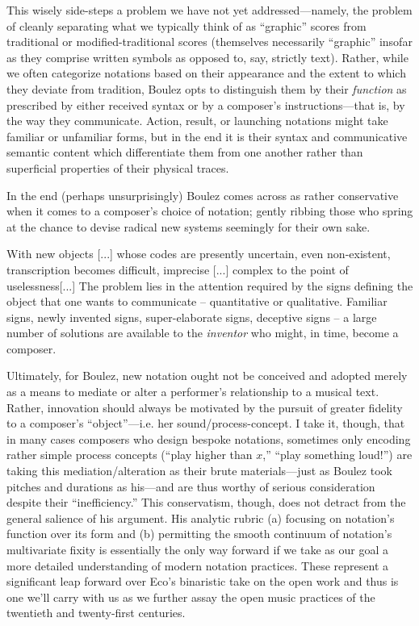     This wisely side-steps a problem we have not yet addressed---namely, the problem of cleanly separating what we typically think of as ``graphic'' scores from traditional or modified-traditional scores (themselves necessarily ``graphic''  insofar as they comprise written symbols as opposed to, say, strictly text). Rather, while we often categorize notations based on their appearance and the extent to which they deviate from tradition, Boulez opts to distinguish them by their \textit{function} as prescribed by either received syntax or by a composer's instructions---that is, by the way they communicate. Action, result, or launching notations might take familiar or unfamiliar forms, but in the end it is their syntax and communicative semantic content which differentiate them from one another rather than superficial properties of their physical traces.

    In the end (perhaps unsurprisingly) Boulez comes across as rather conservative when it comes to a composer's choice of notation; gently ribbing those who spring at the chance to devise radical new systems seemingly for their own sake.

    \begin{smallquote}
        With new objects [...] whose codes are presently uncertain, even non-existent, transcription becomes difficult, imprecise [...] complex to the point of uselessness[...] The problem lies in the attention required by the signs defining the object that one wants to communicate -- quantitative or qualitative. Familiar signs, newly invented signs, super-elaborate signs, deceptive signs -- a large number of solutions are available to the \textit{inventor} who might, in time, become a composer.\autocite[532]{Boulez_Nattiez_2019}
    \end{smallquote}

    \noindent Ultimately, for Boulez, new notation ought not be conceived and adopted merely as a means to mediate or alter a performer's relationship to a musical text. Rather, innovation should always be motivated by the pursuit of greater fidelity to a composer's ``object''---i.e. her sound/process-concept. I take it, though, that in many cases composers who design bespoke notations, sometimes only encoding rather simple process concepts (``play higher than $x$,'' ``play something loud!'') are taking this mediation/alteration as their brute materials---just as Boulez took pitches and durations as his---and are thus worthy of serious consideration despite their ``inefficiency.'' This conservatism, though, does not detract from the general salience of his argument. His analytic rubric (a) focusing on notation's function over its form and (b) permitting the smooth continuum of notation's multivariate fixity is essentially the only way forward if we take as our goal a more detailed understanding of modern notation practices. These represent a significant leap forward over Eco's binaristic take on the open work and thus is one we'll carry with us as we further assay the open music practices of the twentieth and twenty-first centuries. 



